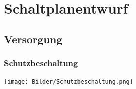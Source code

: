 \documentclass[a4paper,11pt]{scrartcl}
\begin{document}

\section{Schaltplanentwurf}

\subsection{Versorgung}

\subsubsection{Schutzbeschaltung}

\begin{center}
\texttt{[image: Bilder/Schutzbeschaltung.png]}
\end{center}
\end{document}
